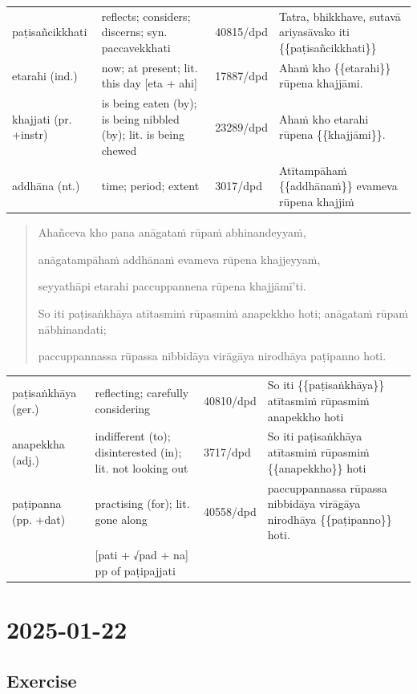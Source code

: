 \documentclass[11pt,oneside]{memoir}
\begin{document}
\begin{longtable}{L{\colOne} L{\colTwo} H H}
paṭisañcikkhati & reflects; considers; discerns; syn. paccavekkhati & 40815/dpd & Tatra, bhikkhave, sutavā ariyasāvako iti \{\{paṭisañcikkhati\}\}\\[0pt]
etarahi (ind.) & now; at present; lit. this day [eta + ahi] & 17887/dpd & Ahaṁ kho \{\{etarahi\}\} rūpena khajjāmi.\\[0pt]
khajjati (pr. +instr) & is being eaten (by); is being nibbled (by); lit. is being chewed & 23289/dpd & Ahaṁ kho etarahi rūpena \{\{khajjāmi\}\}.\\[0pt]
addhāna (nt.) & time; period; extent & 3017/dpd & Atītampāhaṁ \{\{addhānaṁ\}\} evameva rūpena khajjiṁ\\[0pt]
\end{longtable}

\begin{quote}
Ahañceva kho pana anāgataṁ rūpaṁ abhinandeyyaṁ,

anāgatampāhaṁ addhānaṁ evameva rūpena khajjeyyaṁ,

seyyathāpi etarahi paccuppannena rūpena khajjāmī’ti.

So iti paṭisaṅkhāya atītasmiṁ rūpasmiṁ anapekkho hoti; anāgataṁ rūpaṁ nābhinandati;

paccuppannassa rūpassa nibbidāya virāgāya nirodhāya paṭipanno hoti.
\end{quote}

\begin{longtable}{L{\colOne} L{\colTwo} H H}
paṭisaṅkhāya (ger.) & reflecting; carefully considering & 40810/dpd & So iti \{\{paṭisaṅkhāya\}\} atītasmiṁ rūpasmiṁ anapekkho hoti\\[0pt]
anapekkha (adj.) & indifferent (to); disinterested (in); lit. not looking out & 3717/dpd & So iti paṭisaṅkhāya atītasmiṁ rūpasmiṁ \{\{anapekkho\}\} hoti\\[0pt]
paṭipanna (pp. +dat) & practising (for); lit. gone along & 40558/dpd & paccuppannassa rūpassa nibbidāya virāgāya nirodhāya \{\{paṭipanno\}\} hoti.\\[0pt]
 & [pati + √pad + na] pp of paṭipajjati &  & \\[0pt]
\end{longtable}

\chapter{2025-01-22}
\label{sec:orgc939edc}
\section{Exercise}
\label{sec:org6c5f18a}
\end{document}
